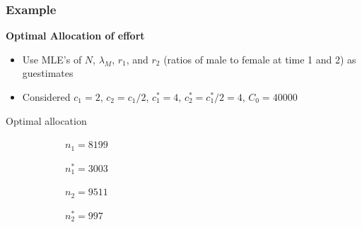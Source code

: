 \documentclass{beamer}
\begin{document}
\begin{frame} \frametitle{Example}
\textbf{{\scriptsize Optimal Allocation of effort }}
\begin{itemize}
\item  {\scriptsize Use MLE's of $N$, $\lambda_{M}$, $r_{1}$, and $r_{2}$ (ratios of male to female at time 1 and 2)  as guestimates}
\item {\scriptsize  Considered $c_{1} =2 $, $c_{2} =c_{1}/2$, $c_{1}^{*} = 4$, $c_{2}^{*} = c_{1}^{*}/2 = 4$, $C_{0} =40000$}
\end{itemize}
\hspace{1cm} {\tiny Optimal allocation}

{\tiny 
$\qquad \qquad \qquad  n_{1} = 8199 $
\vspace{2pt}

$\qquad \qquad \qquad n_{1}^{*} = 3003$ 
\vspace{2pt}

$\qquad \qquad \qquad n_{2} = 9511$
\vspace{2pt}

$\qquad \qquad \qquad n_{2}^{*} = 997 $

}
\end{frame}
\end{document}
